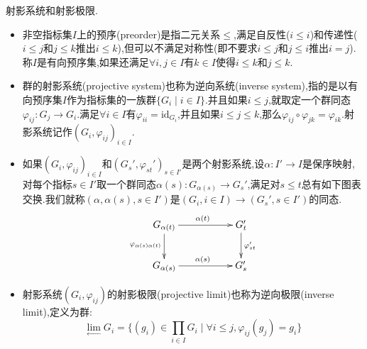 射影系统和射影极限.
\begin{itemize}
	\item 非空指标集$I$上的预序(preorder)是指二元关系$\le$,满足自反性($i\le i$)和传递性($i\le j$和$j\le k$推出$i\le k$),但可以不满足对称性(即不要求$i\le j$和$j\le i$推出$i=j$).称$I$是有向预序集,如果还满足$\forall i,j\in I$有$k\in I$使得$i\le k$和$j\le k$.
	\item 群的射影系统(projective system)也称为逆向系统(inverse system),指的是以有向预序集$I$作为指标集的一族群$\{G_i\mid i\in I\}$.并且如果$i\le j$,就取定一个群同态$\varphi_{ij}:G_j\to G_i$.满足$\forall i\in I$有$\varphi_{ii}=\mathrm{id}_{G_i}$,并且如果$i\le j\le k$,那么$\varphi_{ij}\circ\varphi_{jk}=\varphi_{ik}$.射影系统记作$(G_i,\varphi_{ij})_{i\in I}$.
	\item 如果$(G_i,\varphi_{ij})_{i\in I}$和$(G_s',\varphi_{st}')_{s\in I'}$是两个射影系统,设$\alpha:I'\to I$是保序映射,对每个指标$s\in I'$取一个群同态$\alpha(s):G_{\alpha(s)}\to G_{s}'$,满足对$s\le t$总有如下图表交换.我们就称$(\alpha,\alpha(s),s\in I')$是$(G_i,i\in I)\to(G_s',s\in I')$的同态.
	$$\xymatrix{G_{\alpha(t)}\ar[rr]^{\alpha(t)}\ar[d]_{\varphi_{\alpha(s)\alpha(t)}}&&G_t'\ar[d]^{\varphi'_{st}}\\G_{\alpha(s)}\ar[rr]^{\alpha(s)}&&G_s'}$$
	\item 射影系统$(G_i,\varphi_{ij})$的射影极限(projective limit)也称为逆向极限(inverse limit),定义为群:
	$$\lim\limits_{\leftarrow}G_i=\{(g_i)\in\prod_{i\in I}G_i\mid\forall i\le j,\varphi_{ij}(g_j)=g_i\}$$
\end{itemize}

